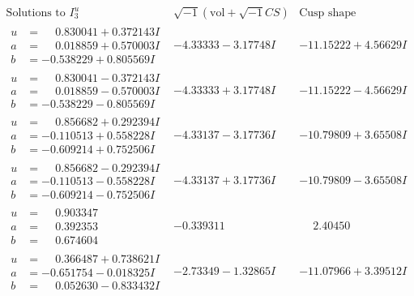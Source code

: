 \documentclass[1p]{elsarticle_modified}
\theoremstyle{definition}
\newcommand{\I}{\sqrt{-1}}
\begin{document}
$$\begin{array}{c|c|c}  
\text{Solutions to }I^u_{3}& \I (\text{vol} + \sqrt{-1}CS) & \text{Cusp shape}\\
 \hline 
\begin{aligned}
u &= \phantom{-}0.830041 + 0.372143 I \\
a &= \phantom{-}0.018859 + 0.570003 I \\
b &= -0.538229 + 0.805569 I\end{aligned}
 & -4.33333 - 3.17748 I & -11.15222 + 4.56629 I \\ \hline\begin{aligned}
u &= \phantom{-}0.830041 - 0.372143 I \\
a &= \phantom{-}0.018859 - 0.570003 I \\
b &= -0.538229 - 0.805569 I\end{aligned}
 & -4.33333 + 3.17748 I & -11.15222 - 4.56629 I \\ \hline\begin{aligned}
u &= \phantom{-}0.856682 + 0.292394 I \\
a &= -0.110513 + 0.558228 I \\
b &= -0.609214 + 0.752506 I\end{aligned}
 & -4.33137 - 3.17736 I & -10.79809 + 3.65508 I \\ \hline\begin{aligned}
u &= \phantom{-}0.856682 - 0.292394 I \\
a &= -0.110513 - 0.558228 I \\
b &= -0.609214 - 0.752506 I\end{aligned}
 & -4.33137 + 3.17736 I & -10.79809 - 3.65508 I \\ \hline\begin{aligned}
u &= \phantom{-}0.903347\phantom{ +0.000000I} \\
a &= \phantom{-}0.392353\phantom{ +0.000000I} \\
b &= \phantom{-}0.674604\phantom{ +0.000000I}\end{aligned}
 & -0.339311\phantom{ +0.000000I} & \phantom{-}2.40450\phantom{ +0.000000I} \\ \hline\begin{aligned}
u &= \phantom{-}0.366487 + 0.738621 I \\
a &= -0.651754 - 0.018325 I \\
b &= \phantom{-}0.052630 - 0.833432 I\end{aligned}
 & -2.73349 - 1.32865 I & -11.07966 + 3.39512 I \\ \hline\begin{aligned}

\end{aligned}
\end{array}$$
\end{document}
